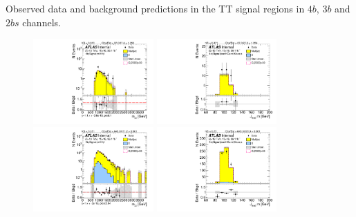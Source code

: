\begin{table}[htb!]
\begin{center}
\caption{Observed data and background predictions in the TT signal regions in $4b$, $3b$ and $2bs$ channels.}

\label{tab:DataPred_ttSR}
\end{center}
\end{table}

\begin{figure}[htb!]
\begin{center}
\includegraphics[width=0.41\textwidth,angle=-90]{figures/boosted/ZZ/Moriond_ZZ_FourTag_Signal_mHH_l_1.pdf}
\includegraphics[width=0.41\textwidth,angle=-90]{figures/boosted/ZZ/Moriond_ZZ_FourTag_Signal_leadHCand_Mass_s.pdf}\\
\includegraphics[width=0.41\textwidth,angle=-90]{figures/boosted/ZZ/Moriond_ZZ_ThreeTag_Signal_mHH_l_1.pdf}
\includegraphics[width=0.41\textwidth,angle=-90]{figures/boosted/ZZ/Moriond_ZZ_ThreeTag_Signal_leadHCand_Mass_s.pdf}\\

\end{center}
\end{figure}

